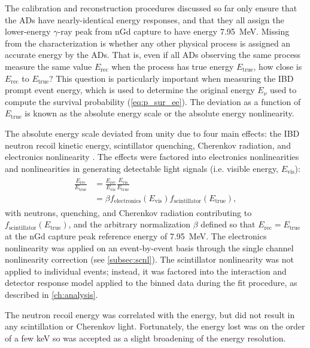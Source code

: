 The calibration and reconstruction procedures discussed so far
only ensure that the ADs have nearly-identical energy responses,
and that they all assign the lower-energy $\gamma$-ray peak from nGd capture
to have energy \SI{7.95}{\MeV}.
Missing from the characterization is whether any other physical process
is assigned an accurate energy by the ADs.
That is, even if all ADs observing the same process
measure the same value $E_{\text{rec}}$
when the process has true energy $E_{\text{true}}$,
how close is $E_{\text{rec}}$ to $E_{\text{true}}$?
This question is particularly important when measuring the IBD prompt event energy,
which is used to determine the original \nuebar{} energy $E_\nu$
used to compute the survival probability (\cref{eq:p_sur_ee}).
The deviation as a function of $E_{\text{true}}$ is known as
the absolute energy scale or the absolute energy nonlinearity.

The absolute energy scale deviated from unity due to four main effects:
the IBD neutron recoil kinetic energy, scintillator quenching,
Cherenkov radiation, and electronics nonlinearity \cite{ngd2016}.
The effects were factored into electronics nonlinearities
and nonlinearities in generating detectable light signals
(i.e. visible energy, $E_{\text{vis}}$):
\begin{align}
    \begin{split}
        \frac{E_{\text{rec}}}{E_{\text{true}}}
        &=
        \frac{E_{\text{rec}}}{E_{\text{vis}}}
        \frac{E_{\text{vis}}}{E_{\text{true}}} \\
        &= \beta f_{\text{electronics}}(E_{\text{vis}})
        f_{\text{scintillator}}(E_{\text{true}}),
    \end{split}
\end{align}
with neutrons, quenching, and Cherenkov radiation contributing to
$f_{\text{scintillator}}(E_{\text{true}})$,
and the arbitrary normalization $\beta$ defined so that
$E_{\text{rec}} = E_{\text{true}}$
at the nGd capture peak reference energy of \SI{7.95}{\MeV}.
The electronics nonlinearity was applied on an event-by-event basis
through the single channel nonlinearity correction (see \cref{subsec:scnl}).
The scintillator nonlinearity was not applied to individual events;
instead, it was factored into the interaction and detector response model
applied to the binned data during the \thetaot{} fit procedure,
as described in \cref{ch:analysis}.

The neutron recoil energy was correlated with the \nuebar{} energy,
but did not result in any scintillation or Cherenkov light.
Fortunately, the energy lost was on the order of a few \si{\keV}
so was accepted as a slight broadening of the energy resolution.

